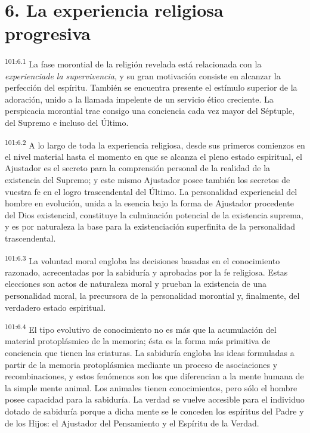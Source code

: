 \section*{6. La experiencia religiosa progresiva}
\par
\textsuperscript{101:6.1} La fase morontial de la religión revelada está relacionada con la \textit{experienciade la supervivencia}, y su gran motivación consiste en alcanzar la perfección del espíritu. También se encuentra presente el estímulo superior de la adoración, unido a la llamada impelente de un servicio ético creciente. La perspicacia morontial trae consigo una conciencia cada vez mayor del Séptuple, del Supremo e incluso del Último.

\par
\textsuperscript{101:6.2} A lo largo de toda la experiencia religiosa, desde sus primeros comienzos en el nivel material hasta el momento en que se alcanza el pleno estado espiritual, el Ajustador es el secreto para la comprensión personal de la realidad de la existencia del Supremo; y este mismo Ajustador posee también los secretos de vuestra fe en el logro trascendental del Último. La personalidad experiencial del hombre en evolución, unida a la esencia bajo la forma de Ajustador procedente del Dios existencial, constituye la culminación potencial de la existencia suprema, y es por naturaleza la base para la existenciación superfinita de la personalidad trascendental.

\par
\textsuperscript{101:6.3} La voluntad moral engloba las decisiones basadas en el conocimiento razonado, acrecentadas por la sabiduría y aprobadas por la fe religiosa. Estas elecciones son actos de naturaleza moral y prueban la existencia de una personalidad moral, la precursora de la personalidad morontial y, finalmente, del verdadero estado espiritual.

\par
\textsuperscript{101:6.4} El tipo evolutivo de conocimiento no es más que la acumulación del material protoplásmico de la memoria; ésta es la forma más primitiva de conciencia que tienen las criaturas. La sabiduría engloba las ideas formuladas a partir de la memoria protoplásmica mediante un proceso de asociaciones y recombinaciones, y estos fenómenos son los que diferencian a la mente humana de la simple mente animal. Los animales tienen conocimientos, pero sólo el hombre posee capacidad para la sabiduría. La verdad se vuelve accesible para el individuo dotado de sabiduría porque a dicha mente se le conceden los espíritus del Padre y de los Hijos: el Ajustador del Pensamiento y el Espíritu de la Verdad.

